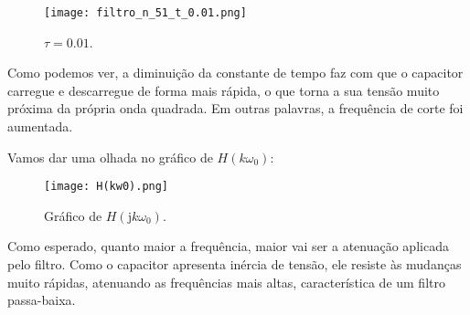 \documentclass[10pt,twocolumn]{article}
\renewcommand{\j}{\ensuremath{\mathrm{j}}}
\newcommand{\?}{\stackrel{?}{=}}
\begin{document}
\begin{figure}[h!]
	\texttt{[image: filtro\_n\_51\_t\_0.01.png]}
	\centering
	\caption{$\tau=\num{0.01}$.}
\end{figure}
\FloatBarrier

Como podemos ver, a diminuição da constante de tempo faz com que o capacitor carregue e descarregue de forma mais rápida, o que torna a sua tensão muito próxima da própria onda quadrada. Em outras palavras, a frequência de corte foi aumentada.

Vamos dar uma olhada no gráfico de $H(k\omega_0)$:

\FloatBarrier
\begin{figure}[h!]
	\texttt{[image: H(kw0).png]}
	\centering
	\caption{Gráfico de $H(\j k\omega_0)$.}
\end{figure}
\FloatBarrier

Como esperado, quanto maior a frequência, maior vai ser a atenuação aplicada pelo filtro. Como o capacitor apresenta inércia de tensão, ele resiste às mudanças muito rápidas, atenuando as frequências mais altas, característica de um filtro passa-baixa.
\end{document}
